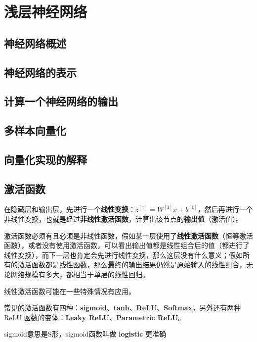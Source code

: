 \documentclass[../../main.tex]{subfiles}
\begin{document}
\chapter{浅层神经网络}

\section{神经网络概述}

\section{神经网络的表示}

\section{计算一个神经网络的输出}

\section{多样本向量化}

\section{向量化实现的解释}

\section{激活函数}
在隐藏层和输出层，先进行一个\textbf{线性变换}：\(z^{[1]}=W^{[1]}x + b^{[1]}\)，然后再进行一个非线性变换，也就是经过\textbf{非线性激活函数}，计算出该节点的\textbf{输出值}（激活值）。

激活函数必须有且必须是非线性函数，假如某一层使用了\textbf{线性激活函数}（恒等激活函数），或者没有使用激活函数，可以看出输出值都是线性组合后的值（都进行了线性变换），而下一层也肯定会先进行线性变换，那么这层没有什么意义；假如所有的激活函数都是线性函数，那么最终的输出结果仍然是原始输入的线性组合，无论网络规模有多大，都相当于单层的线性回归。\\
\begin{remark}
    线性激活函数可能在一些特殊情况有应用。
\end{remark}


常见的激活函数有四种：\textbf{sigmoid}、\textbf{tanh}、\textbf{ReLU}、\textbf{Softmax}，另外还有两种 ReLU 函数的变体：\textbf{Leaky ReLU}、\textbf{Parametric ReLU}。\\
\begin{remark}
    sigmoid意思是S形，sigmoid函数叫做 \textbf{logistic} 更准确
\end{remark}
\end{document}

